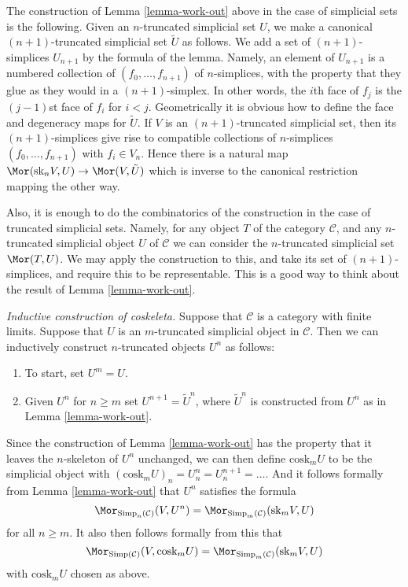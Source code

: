\begin{remark}
\label{remark-cosk-simplicial-sets}
The construction of Lemma \ref{lemma-work-out}
above in the case of simplicial
sets is the following. Given an $n$-truncated simplicial
set $U$, we make a canonical $(n + 1)$-truncated simplicial
set $\tilde U$ as follows. We add a set of $(n + 1)$-simplices
$U_{n + 1}$ by the formula of the lemma. Namely,
an element of $U_{n + 1}$ is a numbered collection of
$(f_0, \ldots, f_{n + 1})$ of $n$-simplices,
with the property that they glue
as they would in a $(n + 1)$-simplex. In other words,
the $i$th face of $f_j$ is the $(j-1)$st face of $f_i$
for $i < j$. Geometrically it is obvious how to define the
face and degeneracy maps for $\tilde U$.
If $V$ is an $(n + 1)$-truncated simplicial set,
then its $(n + 1)$-simplices give rise to compatible collections
of $n$-simplices $(f_0, \ldots, f_{n + 1})$ with $f_i \in V_n$.
Hence there is a natural map
$\Mor(\text{sk}_nV, U) \to \Mor(V, \tilde U)$
which is inverse to the canonical restriction mapping
the other way.

\medskip\noindent
Also, it is enough to do the combinatorics of the
construction in the case of truncated simplicial sets.
Namely, for any object $T$ of the category $\mathcal{C}$,
and any $n$-truncated simplicial object $U$ of $\mathcal{C}$
we can consider the $n$-truncated simplicial set
$\Mor(T, U)$. We may apply the construction to this,
and take its set of $(n + 1)$-simplices, and require this to be
representable. This is a good way to think about
the result of Lemma \ref{lemma-work-out}.
\end{remark}

\begin{remark}
\label{remark-inductive-coskeleton}
{\it Inductive construction of coskeleta.}
Suppose that $\mathcal{C}$ is a category with
finite limits. Suppose that $U$ is an $m$-truncated
simplicial object in $\mathcal{C}$. Then we can
inductively construct $n$-truncated objects $U^n$ as
follows:
\begin{enumerate}
\item To start, set $U^m = U$.
\item Given $U^n$ for $n \geq m$ set $U^{n + 1} = \tilde U^n$,
where $\tilde U^n$ is constructed from $U^n$ as in Lemma
\ref{lemma-work-out}.
\end{enumerate}
Since the construction of Lemma \ref{lemma-work-out} has
the property that it leaves the $n$-skeleton of $U^n$
unchanged, we can then define $\text{cosk}_m U$ to be
the simplicial object with
$(\text{cosk}_m U)_n = U^n_n = U^{n + 1}_n = \ldots$.
And it follows formally from Lemma \ref{lemma-work-out}
that $U^n$ satisfies the formula
$$
\Mor_{\text{Simp}_n(\mathcal{C})}(V, U^n)
=
\Mor_{\text{Simp}_m(\mathcal{C})}(\text{sk}_mV, U)
$$
for all $n \geq m$. It also then follows formally
from this that
$$
\Mor_{\text{Simp}(\mathcal{C})}(V, \text{cosk}_mU)
=
\Mor_{\text{Simp}_m(\mathcal{C})}(\text{sk}_mV, U)
$$
with $\text{cosk}_mU$ chosen as above.
\end{remark}

